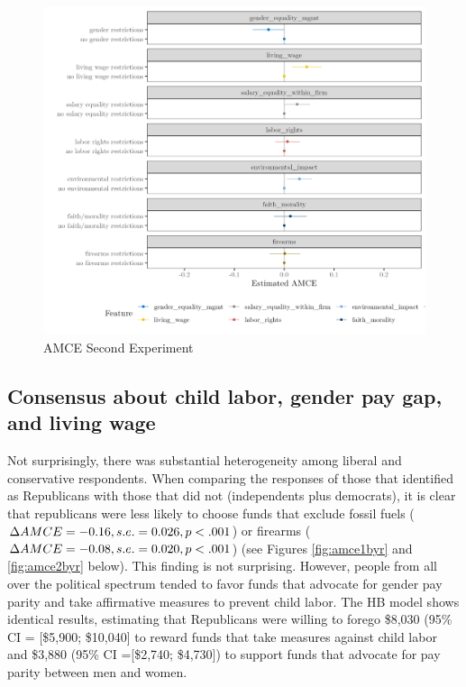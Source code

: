 \documentclass[
  12pt,
]{article}
\begin{document}
\begin{figure}

{\centering \includegraphics{amcecj2jmainb} 

}

\caption{AMCE Second Experiment}\label{fig:amce2cjmain}
\end{figure}

\hypertarget{consensus-about-child-labor-gender-pay-gap-and-living-wage}{%
\subsection{Consensus about child labor, gender pay gap, and living wage}\label{consensus-about-child-labor-gender-pay-gap-and-living-wage}}

Not surprisingly, there was substantial heterogeneity among liberal and conservative respondents. When comparing the responses of those that identified as Republicans with those that did not (independents plus democrats), it is clear that republicans were less likely to choose funds that exclude fossil fuels (\(\Delta AMCE = -0.16, \space s.e. = 0.026, \space p <.001\)) or firearms (\(\Delta AMCE = -0.08, \space s.e. = 0.020, \space p<.001\)) (see Figures \ref{fig:amce1byr} and \ref{fig:amce2byr} below). This finding is not surprising. However, people from all over the political spectrum tended to favor funds that advocate for gender pay parity and take affirmative measures to prevent child labor. The HB model shows identical results, estimating that Republicans were willing to forego \$8,030 (95\% CI = {[}\$5,900; \$10,040{]} to reward funds that take measures against child labor and \$3,880 (95\% CI ={[}\$2,740; \$4,730{]}) to support funds that advocate for pay parity between men and women.
\end{document}

